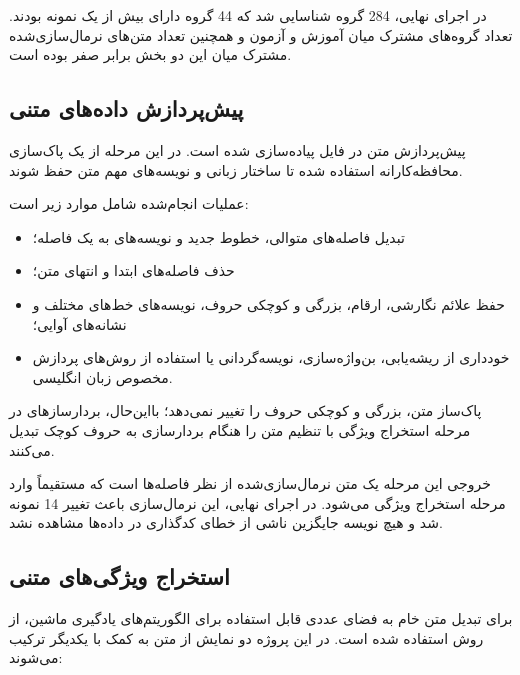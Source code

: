 \documentclass[12pt,a4paper,oneside]{report}
\begin{document}
در اجرای نهایی، 284 گروه شناسایی شد که 44 گروه دارای بیش از یک نمونه بودند. تعداد گروه‌های مشترک میان آموزش و آزمون و همچنین تعداد متن‌های نرمال‌سازی‌شده مشترک میان این دو بخش برابر صفر بوده است.


\subsection{پیش‌پردازش داده‌های متنی}

پیش‌پردازش متن در فایل
پیاده‌سازی شده است. در این مرحله از یک پاک‌سازی محافظه‌کارانه استفاده شده تا ساختار زبانی و نویسه‌های مهم متن حفظ شوند.

عملیات انجام‌شده شامل موارد زیر است:

\begin{itemize}
	\item تبدیل فاصله‌های متوالی، خطوط جدید و نویسه‌های
	به یک فاصله؛

	\item حذف فاصله‌های ابتدا و انتهای متن؛

	\item حفظ علائم نگارشی، ارقام، بزرگی و کوچکی حروف، نویسه‌های خط‌های مختلف و نشانه‌های آوایی؛

	\item خودداری از ریشه‌یابی، بن‌واژه‌سازی، نویسه‌گردانی یا استفاده از روش‌های پردازش مخصوص زبان انگلیسی.
\end{itemize}

پاک‌ساز متن، بزرگی و کوچکی حروف را تغییر نمی‌دهد؛ بااین‌حال، بردارسازهای
در مرحله استخراج ویژگی با تنظیم
متن را هنگام بردارسازی به حروف کوچک تبدیل می‌کنند.

خروجی این مرحله یک متن نرمال‌سازی‌شده از نظر فاصله‌ها است که مستقیماً وارد مرحله استخراج ویژگی می‌شود. در اجرای نهایی، این نرمال‌سازی باعث تغییر 14 نمونه شد و هیچ نویسه جایگزین ناشی از خطای کدگذاری در داده‌ها مشاهده نشد.


\subsection{استخراج ویژگی‌های متنی}

برای تبدیل متن خام به فضای عددی قابل استفاده برای الگوریتم‌های یادگیری ماشین، از روش
استفاده شده است. در این پروژه دو نمایش از متن به کمک
با یکدیگر ترکیب می‌شوند:
\end{document}
